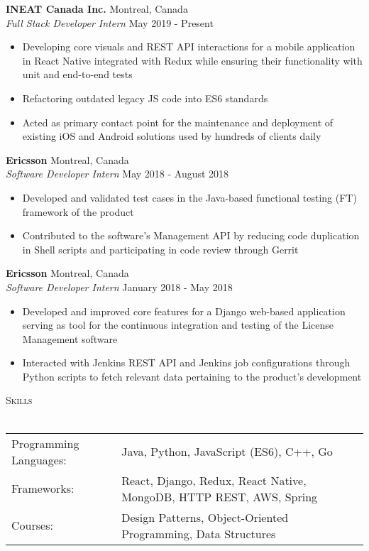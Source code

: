 \documentclass[a4paper]{article}
\newcommand{\lineunder} {
    \vspace*{-8pt} \\
    \hspace*{-18pt} \hrulefill \\
}
\newcommand{\header} [1] {
    {\hspace*{-18pt}\vspace*{6pt} \textsc{#1}}
    \vspace*{-6pt} \lineunder
}
\begin{document}
\textbf{INEAT Canada Inc.} \hfill Montreal, Canada\\
\textit{Full Stack Developer Intern} \hfill May 2019 - Present\\
\vspace{-1mm}
\begin{itemize} \itemsep 1pt
	\item Developing core visuals and REST API interactions for a mobile application in React Native integrated with Redux while ensuring their functionality with unit and end-to-end tests
	\item Refactoring outdated legacy JS code into ES6 standards
	\item Acted as primary contact point for the maintenance and deployment of existing iOS and Android solutions used by hundreds of clients daily
\end{itemize}
\textbf{Ericsson} \hfill Montreal, Canada\\
\textit{Software Developer Intern} \hfill May 2018 - August 2018\\
\vspace{-1mm}
\begin{itemize} \itemsep 1pt
	\item Developed and validated test cases in the Java-based functional testing (FT) framework of the product
	\item Contributed to the software’s Management API by reducing code duplication in Shell scripts and participating in code review through Gerrit
\end{itemize}
\textbf{Ericsson} \hfill Montreal, Canada\\
\textit{Software Developer Intern} \hfill January 2018 - May 2018\\
\vspace{-1mm}
\begin{itemize} \itemsep 1pt
	\item Developed and improved core features for a Django web-based application serving as tool for the continuous integration and testing of the License Management software
	\item Interacted with Jenkins REST API and Jenkins job configurations through Python scripts to fetch relevant data pertaining to the product’s development
\end{itemize}

\header{Skills}
\vspace*{2mm}
\begin{tabular}{ l l }
	Programming Languages: & Java, Python, JavaScript (ES6), C++, Go                             \\
	Frameworks:            & React, Django, Redux, React Native, MongoDB, HTTP REST, AWS, Spring \\
	Courses:               & Design Patterns, Object-Oriented Programming, Data Structures       \\
\end{tabular}
\vspace{2mm}
\end{document}
